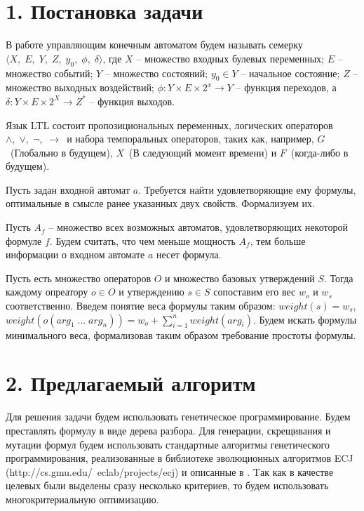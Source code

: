 \documentclass[12pt,fleqn]{article}
\begin{document}
\section*{1. Постановка задачи}

В работе управляющим конечным автоматом будем называть семерку $\langle X,\; E,\; Y,\; Z,\; y_0,\; \phi,\; \delta \rangle$,
где $X$ -- множество входных булевых переменных; $E$ -- множество событий; $Y$ -- множество состояний;
$y_0 \in Y$ -- начальное состояние; $Z$ -- множество выходных воздействий;
$\phi : Y \times E \times 2^x \rightarrow Y$ -- функция переходов, а
$\delta : Y \times E \times 2^X \rightarrow Z^*$ -- функция выходов.

Язык LTL состоит пропозициональных переменных, логических операторов $\wedge,\; \vee,\; \lnot,\; \rightarrow$\ и набора
темпоральных операторов, таких как, например, $G$\ (Глобально в будущем), $X$\ (В следующий момент времени) и
$F$\ (когда-либо в будущем).

Пусть задан входной автомат $a$. Требуется найти удовлетворяющие ему формулы, оптимальные в смысле ранее указанных
двух свойств. Формализуем их.

Пусть $A_f$ -- множество всех возможных автоматов, удовлетворяющих некоторой формуле $f$. Будем считать,
что чем меньше мощность $A_f$, тем больше информации о входном автомате $a$ несет формула.

Пусть есть множество операторов $O$ и множество базовых утверждений $S$.
Тогда каждому опреатору $o \in O$ и утверждению $s \in S$ сопоставим его вес $w_o$ и $w_s$ соответственно.
Введем понятие веса формулы таким образом: $weight(s) = w_s$, $weight(o(arg_1\; \ldots \; arg_n)) = w_o + \sum_{i=1}^{n}weight(arg_i)$.
Будем искать формулы минимального веса, формализовав таким образом требование простоты формулы.

\section*{2. Предлагаемый алгоритм}

Для решения задачи будем использовать генетическое программирование. Будем преставлять формулу в виде дерева разбора.
Для генерации, скрещивания и мутации формул будем использовать стандартные алгоритмы генетического программирования,
реализованные в библиотеке эволюционных алгоритмов ECJ (http://cs.gmu.edu/~eclab/projects/ecj) и описанные в \cite{kz1,kz2}.
Tак как в качестве целевых были выделены сразу несколько критериев, то будем использовать многокритериальную оптимизацию.
\end{document}

